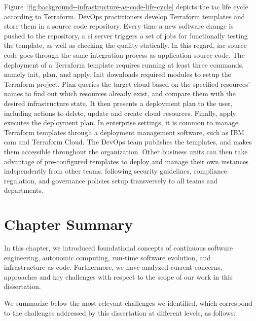 Figure~\ref{fig:background--infrastructure-as-code-life-cycle} depicts the \gls{iac} life cycle according to Terraform. DevOps practitioners develop Terraform templates and store them in a source code repository. Every time a new software change is pushed to the repository, a \gls{ci} server triggers a set of jobs for functionally testing the template, as well as checking the quality statically. In this regard, \gls{iac} source code goes through the same integration process as application source code. The deployment of a Terraform template requires running at least three commands, namely init, plan, and apply. Init downloads required modules to setup the Terraform project. Plan queries the target cloud based on the specified resources' names to find out which resources already exist, and compare them with the desired infrastructure state. It then presents a deployment plan to the user, including actions to delete, update and create cloud resources. Finally, apply executes the deployment plan. In enterprise settings, it is common to manage Terraform templates through a deployment management software, such as IBM \gls{cam} and Terraform Cloud. The DevOps team publishes the templates, and makes them accessible throughout the organization. Other business units can then take advantage of pre-configured templates to deploy and manage their own instances independently from other teams, following security guidelines, compliance regulation, and governance policies setup transversely to all teams and departments.

\section{Chapter Summary}

In this chapter, we introduced foundational concepts of continuous software engineering, autonomic computing, run-time software evolution, and infrastructure as code. Furthermore, we have analyzed current concerns, approaches and key challenges with respect to the scope of our work in this dissertation. 

We summarize below the most relevant challenges we identified, which correspond to the challenges addressed by this dissertation at different levels, as follows:

